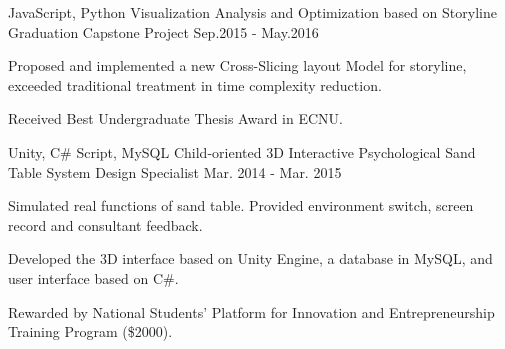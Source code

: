 


\begin{cventries}


\cventry
{JavaScript, Python} %
{Visualization Analysis and Optimization based on Storyline} %
{Graduation Capstone Project} %
{Sep.2015  -  May.2016} %
{ %
\begin{cvitems}
\item {Proposed and implemented a new Cross-Slicing layout Model for storyline, exceeded traditional treatment in time complexity reduction.}
\item {Received Best Undergraduate Thesis Award in ECNU.}
\end{cvitems} 
}

\cventry
{Unity, C\# Script, MySQL} %
{Child-oriented 3D Interactive Psychological Sand Table System} %
{Design Specialist} %
{Mar. 2014  -  Mar. 2015} %
{ %
\begin{cvitems}
\item {Simulated real functions of sand table. Provided environment switch, screen record and consultant feedback. }
\item {Developed the 3D interface based on Unity Engine, a database in MySQL, and user interface based on C\#.}
\item {Rewarded by National Students’ Platform for Innovation and Entrepreneurship Training Program (\$2000).}
\end{cvitems} 
}





\end{cventries}